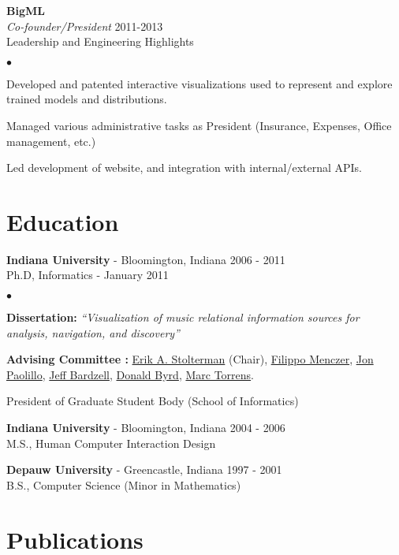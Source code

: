 \documentclass[margin,line]{res}
\newenvironment{list2}{
  \begin{list}{$\bullet$}{%
      \setlength{\itemsep}{0in}
      \setlength{\parsep}{0in} \setlength{\parskip}{0in}
      \setlength{\topsep}{0in} \setlength{\partopsep}{0in} 
      \setlength{\leftmargin}{0.2in}}}{\end{list}}
\begin{document}
\begin{resume}
{\bf BigML} \\
{\em Co-founder/President} \hfill 2011-2013\\
Leadership and Engineering Highlights
\begin{list2}
  \item Developed and patented interactive visualizations used to represent and explore trained models and distributions.
  \item Managed various administrative tasks as President (Insurance, Expenses, Office management, etc.)
  \item Led development of website, and integration with internal/external APIs.
\end{list2}


\section{\sc Education}
{\bf Indiana University} - Bloomington, Indiana \hfill 2006 - 2011\\
Ph.D, Informatics - January 2011
\begin{list2}
\item {\bf \small Dissertation:} {\em``Visualization of music relational information sources for analysis, navigation, and discovery''}
\item {\bf \small Advising Committee :}
  \href{https://luddy.indiana.edu/contact/profile/?Erik_Stolterman~Bergqvist}{Erik A. Stolterman} (Chair),
  \href{https://en.wikipedia.org/wiki/Filippo_Menczer}{Filippo Menczer},
  \href{https://luddy.indiana.edu/contact/profile/?profile_id=269}{Jon Paolillo},
  \href{https://ist.psu.edu/directory/jsb6077a}{Jeff Bardzell},
  \href{https://homes.luddy.indiana.edu/donbyrd/}{Donald Byrd},
  \href{https://marctorrens.net/}{Marc Torrens}.
\item {President of Graduate Student Body (School of Informatics)}
\end{list2}

{\bf Indiana University} - Bloomington, Indiana \hfill 2004 - 2006\\
M.S., Human Computer Interaction Design

{\bf Depauw University} - Greencastle, Indiana \hfill 1997 - 2001\\
B.S., Computer Science (Minor in Mathematics)


\vspace{20px}
\section{\sc Publications}

\end{resume}
\end{document}
